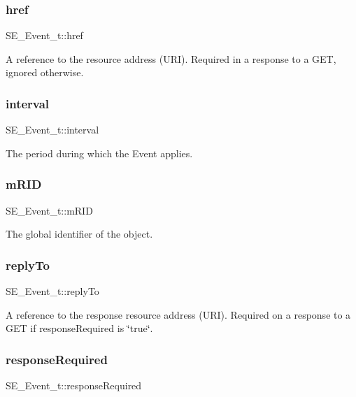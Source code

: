 \subsubsection{\texorpdfstring{href}{href}}
{\footnotesize\ttfamily S\+E\+\_\+\+Event\+\_\+t\+::href}

A reference to the resource address (U\+RI). Required in a response to a G\+ET, ignored otherwise. \mbox{\label{group__Event_gaeaa7db57ff123c151dba417d4d60ec42}} 
\subsubsection{\texorpdfstring{interval}{interval}}
{\footnotesize\ttfamily S\+E\+\_\+\+Event\+\_\+t\+::interval}

The period during which the Event applies. \mbox{\label{group__Event_ga6985465bb16ad66b47d319bbce654b5c}} 
\subsubsection{\texorpdfstring{m\+R\+ID}{mRID}}
{\footnotesize\ttfamily S\+E\+\_\+\+Event\+\_\+t\+::m\+R\+ID}

The global identifier of the object. \mbox{\label{group__Event_ga6e7f7661e18f5488e25401be9e7ee189}} 
\subsubsection{\texorpdfstring{reply\+To}{replyTo}}
{\footnotesize\ttfamily S\+E\+\_\+\+Event\+\_\+t\+::reply\+To}

A reference to the response resource address (U\+RI). Required on a response to a G\+ET if response\+Required is \char`\"{}true\char`\"{}. \mbox{\label{group__Event_ga78cfb38c0c12b9e22a7bc22493dfc841}} 
\subsubsection{\texorpdfstring{response\+Required}{responseRequired}}
{\footnotesize\ttfamily S\+E\+\_\+\+Event\+\_\+t\+::response\+Required}

